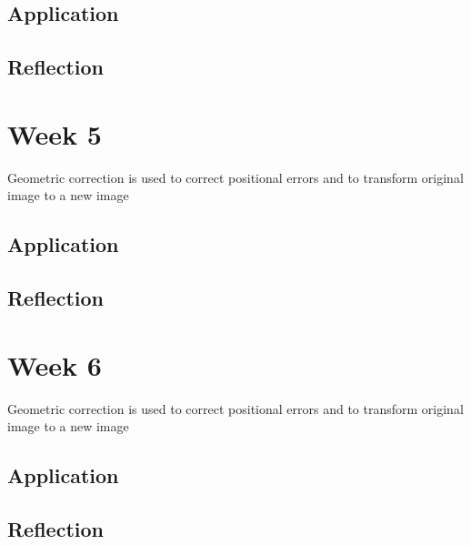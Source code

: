 \documentclass[
  letterpaper,
  DIV=11,
  numbers=noendperiod]{scrreprt}
\begin{document}
\hypertarget{application-2}{%
\section{Application}\label{application-2}}

\hypertarget{reflection-2}{%
\section{Reflection}\label{reflection-2}}


\hypertarget{week-5}{%
\chapter{Week 5}\label{week-5}}

Geometric correction is used to correct positional errors and to
transform original image to a new image

\hypertarget{application-3}{%
\section{Application}\label{application-3}}

\hypertarget{reflection-3}{%
\section{Reflection}\label{reflection-3}}


\hypertarget{week-6}{%
\chapter{Week 6}\label{week-6}}

Geometric correction is used to correct positional errors and to
transform original image to a new image

\hypertarget{application-4}{%
\section{Application}\label{application-4}}

\hypertarget{reflection-4}{%
\section{Reflection}\label{reflection-4}}

\end{document}

